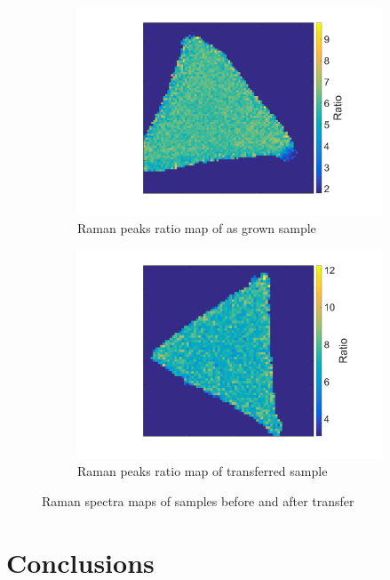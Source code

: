 \begin{figure}[ht]
\begin{center}
\begin{subfigure}[b]{0.4\textwidth}
			\includegraphics[scale=0.15]{Transfer/TransferRamanRatioMapAsgrown.png}
			\caption{Raman peaks ratio map of as grown sample}
			\label{fig:TransferRamanRatioAMapAsgrown}
		\end{subfigure}
		\quad
		\begin{subfigure}[b]{0.4\textwidth}
			\includegraphics[scale=0.15]{Transfer/TransferRamanRatioMapTransferred.png}
			\caption{Raman peaks ratio map of transferred sample}
			\label{fig:TransferRamanRatioAMapTransferred}
		\end{subfigure}
		\caption{Raman spectra maps of samples before and after transfer}
		\label{fig:TransferRamanDiffRatioMapsComparison}
	\end{center}
\end{figure}
	
\section{Conclusions}
	
